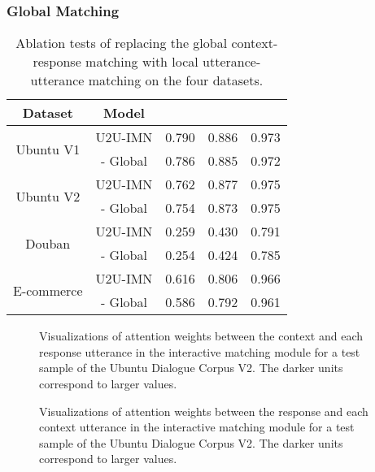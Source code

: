 \documentclass[journal]{IEEEtran}
\begin{document}
    \subsubsection{Global Matching}

    \begin{table}[t]
    \small
    \caption{Ablation tests of replacing the global context-response matching with local utterance-utterance matching on the four datasets.}
    \centering
    \begin{tabular}{c|c|c|c|c}
    \toprule
     Dataset                    & Model &  &  &   \\
    \hline
    \multirow{2}{*}{Ubuntu V1}  & U2U-IMN              & 0.790 & 0.886 & 0.973  \\
                                & - Global             & 0.786 & 0.885 & 0.972  \\
    \hline
    \multirow{2}{*}{Ubuntu V2}  & U2U-IMN              & 0.762 & 0.877 & 0.975  \\
                                & - Global             & 0.754 & 0.873 & 0.975  \\
    \hline
    \multirow{2}{*}{Douban}     & U2U-IMN              & 0.259 & 0.430 & 0.791  \\
                                & - Global             & 0.254 & 0.424 & 0.785  \\
    \hline
    \multirow{2}{*}{E-commerce} & U2U-IMN              & 0.616 & 0.806 & 0.966  \\
                                & - Global             & 0.586 & 0.792 & 0.961  \\
    \bottomrule
    \end{tabular}
    \label{tab10}
    \end{table}

    \begin{figure}[t]
    \centering
    \caption{Visualizations of attention weights between the context and each response utterance in the interactive matching module  for a test sample of the Ubuntu Dialogue Corpus V2. The darker units correspond to larger values.}
    \label{fig2}
    \end{figure}

    \begin{figure}[t]
    \centering
    \caption{Visualizations of attention weights between the response and each context utterance in the interactive matching module for a test sample of the Ubuntu Dialogue Corpus V2. The darker units correspond to larger values.}
    \label{fig5}
    \end{figure}
\end{document}
